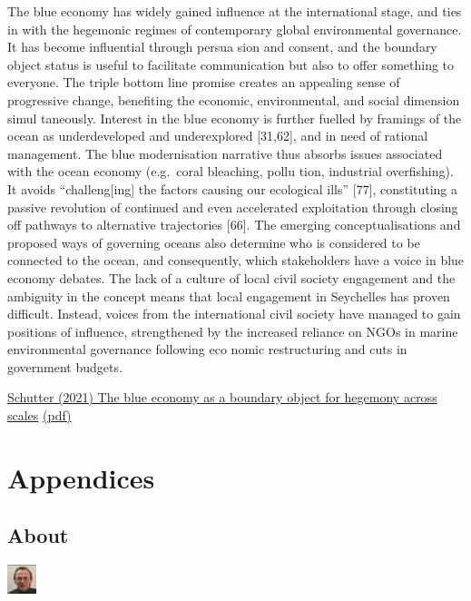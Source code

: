 \documentclass[
]{book}
\begin{document}
The blue economy has widely gained influence at the international
stage, and ties in with the hegemonic regimes of contemporary global
environmental governance. It has become influential through persua­
sion and consent, and the boundary object status is useful to facilitate
communication but also to offer something to everyone. The triple
bottom line promise creates an appealing sense of progressive change,
benefiting the economic, environmental, and social dimension simul­
taneously. Interest in the blue economy is further fuelled by framings of
the ocean as underdeveloped and underexplored {[}31,62{]}, and in need of
rational management. The blue modernisation narrative thus absorbs
issues associated with the ocean economy (e.g.~coral bleaching, pollu­
tion, industrial overfishing). It avoids ``challeng{[}ing{]} the factors causing
our ecological ills'' {[}77{]}, constituting a passive revolution of continued
and even accelerated exploitation through closing off pathways to
alternative trajectories {[}66{]}.
The emerging conceptualisations and proposed ways of governing
oceans also determine who is considered to be connected to the ocean,
and consequently, which stakeholders have a voice in blue economy
debates. The lack of a culture of local civil society engagement and the
ambiguity in the concept means that local engagement in Seychelles has
proven difficult. Instead, voices from the international civil society have
managed to gain positions of influence, strengthened by the increased
reliance on NGOs in marine environmental governance following eco­
nomic restructuring and cuts in government budgets.

\href{https://www.sciencedirect.com/science/article/pii/S0308597X21002840}{Schutter (2021) The blue economy as a boundary object for hegemony across scales}
\href{pdf/Schutter_2021_Blue_Economy.pdf}{(pdf)}

\hypertarget{part-appendices}{%
\part{Appendices}\label{part-appendices}}

\hypertarget{appendix-appendices}{%
\appendix}


\hypertarget{about}{%
\chapter{About}\label{about}}

\includegraphics{fig/me.jpg}
\end{document}
